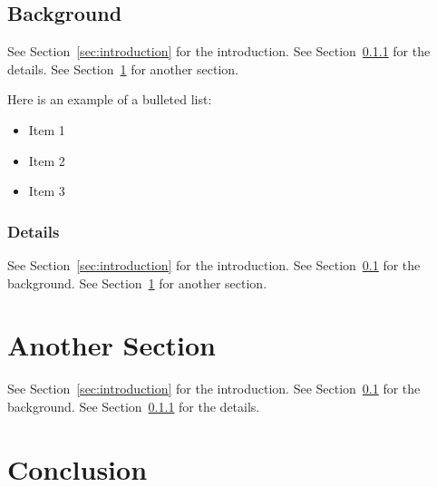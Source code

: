 \documentclass[]{article}
\begin{document}
\subsection{Background}
\label{sec:background}
See Section~\ref{sec:introduction} for the introduction.
See Section~\ref{sec:details} for the details.
See Section~\ref{sec:another-section} for another section.

Here is an example of a bulleted list:
\begin{itemize}
  \item Item 1
  \item Item 2
  \item Item 3
\end{itemize}

\subsubsection{Details}
\label{sec:details}
See Section~\ref{sec:introduction} for the introduction.
See Section~\ref{sec:background} for the background.
See Section~\ref{sec:another-section} for another section.

\section{Another Section}
\label{sec:another-section}
See Section~\ref{sec:introduction} for the introduction.
See Section~\ref{sec:background} for the background.
See Section~\ref{sec:details} for the details.

\newpage
\section{Conclusion}
\label{sec:conclusion}

\newpage
\printbibliography
\end{document}
